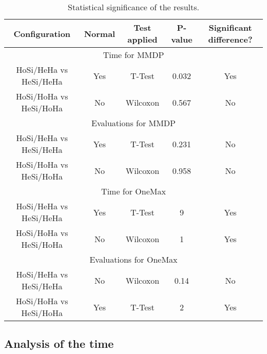 \begin{table*}
\centering
\caption{Statistical significance of the results.}
\begin{tabular}{|c|c|c|c|c|} \hline
Configuration     &Normal &Test applied     &P-value & Significant difference?\\ \hline
\multicolumn{5}{|c|}{Time for MMDP} \\ \hline
HoSi/HeHa vs HeSi/HeHa  &Yes  &T-Test     & 0.032    & Yes \\ \hline
HoSi/HoHa vs HeSi/HoHa  &No   &Wilcoxon   &0.567   & No \\ \hline \hline
\multicolumn{5}{|c|}{Evaluations for MMDP}  \\ \hline
HoSi/HeHa vs HeSi/HeHa  &Yes  &T-Test     &0.231  & No \\ \hline
HoSi/HoHa vs HeSi/HoHa  &No   &Wilcoxon   &0.958  & No \\ \hline \hline
\multicolumn{5}{|c|}{Time for OneMax} \\ \hline
HoSi/HeHa vs HeSi/HeHa  & Yes & T-Test    &  9\e{-15} & Yes \\ \hline
HoSi/HoHa vs HeSi/HoHa  & No  & Wilcoxon    &   1\e{-6} & Yes \\ \hline \hline
\multicolumn{5}{|c|}{Evaluations for OneMax}  \\ \hline
HoSi/HeHa vs HeSi/HeHa  & No  & Wilcoxon    & 0.14    & No\\ \hline
HoSi/HoHa vs HeSi/HoHa  & Yes & T-Test    & 2\e{-27}  & Yes \\ \hline

\end{tabular}
\label{tab:significance}
\end{table*}

\subsection{Analysis of the time}


